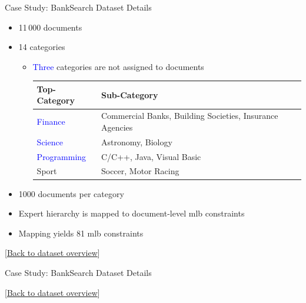 \begin{frame}{Case Study: BankSearch Dataset Details}
\hypertarget{appendix:dataset-detail}{}
\begin{itemize}
    \item 11\,000 documents
    \item 14 categories
    \begin{itemize}
      \item \textcolor{blue}{Three} categories are not assigned to documents\\
       {
      \small
      \begin{tabular}{ll}
          \toprule
          \textbf{Top-Category} & \textbf{Sub-Category} \\
          \midrule
          \textcolor{blue}{Finance} & Commercial Banks, Building Societies, Insurance Agencies\\
          \textcolor{blue}{Science} & Astronomy, Biology \\
          \textcolor{blue}{Programming} & C/C++, Java, Visual Basic \\
          Sport & Soccer, Motor Racing \\
          \bottomrule
      \end{tabular}
      }
    \end{itemize}
   
    \item 1000 documents per category
    \item Expert hierarchy is mapped to document-level \ac{mlb} constraints
    \item Mapping yields 81 \ac{mlb} constraints
\end{itemize}

\vfill
{\tiny[\hyperlink{main:dataset-overview}{Back to dataset overview}]}
\end{frame}

\begin{frame}{Case Study: BankSearch Dataset Details}
\hypertarget{appendix:dataset-detail2}{}

\begin{table}
\centering
\caption{Expert-defined vs.\ data-driven topic assignments $\mathcal{T}$ for BankSearch ($n=11\,000$ documents), where $s_{\min}$ denotes the support of the smallest topic.}
\label{tab:compare-expert-data-driven}

\end{table}

\vfill
{\tiny[\hyperlink{main:dataset-overview}{Back to dataset overview}]}
\end{frame}





